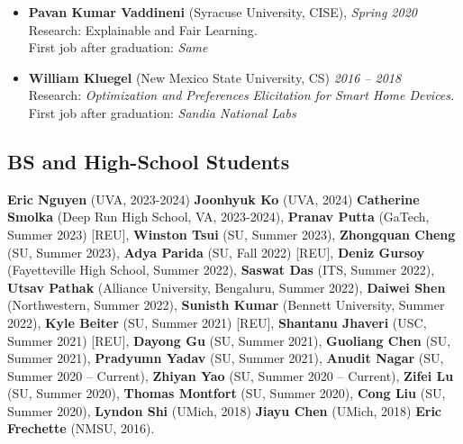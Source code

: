 \begin{itemize}
  \item \textbf{Pavan Kumar Vaddineni}  ({\sc Syracuse University}, CISE), \hfill{\em Spring 2020}\\
  {\sc Research}: Explainable and Fair Learning.\\
  First job after graduation: \textit{Same}

  \item \textbf{William Kluegel} (New Mexico State University, CS) \hfill{\em 2016 -- 2018} \\
  {\sc Research}: \textit{Optimization and Preferences Elicitation for Smart Home Devices.}\\
  First job after graduation: \textit{Sandia National Labs}
\end{itemize}
\medskip

\subsection*{BS and High-School Students}
  \textbf{Eric Nguyen} (UVA, 2023-2024) %
  \textbf{Joonhyuk Ko} (UVA, 2024) %
  \textbf{Catherine Smolka} (Deep Run High School, VA, 2023-2024), 
  \textbf{Pranav Putta} (GaTech, Summer 2023) [REU],
  \textbf{Winston Tsui} (SU, Summer 2023),
  \textbf{Zhongquan Cheng} (SU, Summer 2023), 
  \textbf{Adya Parida} (SU, Fall 2022) [REU], 
  \textbf{Deniz Gursoy} (Fayetteville High School, Summer 2022), 
  \textbf{Saswat Das} (ITS, Summer 2022), 
  \textbf{Utsav Pathak} (Alliance University, Bengaluru, Summer 2022),
  \textbf{Daiwei Shen} (Northwestern, Summer 2022),
  \textbf{Sunisth Kumar} (Bennett University, Summer 2022),
  \textbf{Kyle Beiter} (SU, Summer 2021) [REU],  %
  \textbf{Shantanu Jhaveri} (USC, Summer 2021) [REU], %
  \textbf{Dayong Gu} (SU, Summer 2021),
  \textbf{Guoliang Chen} (SU, Summer 2021),
  \textbf{Pradyumn Yadav} (SU, Summer 2021),
  \textbf{Anudit Nagar} (SU, Summer 2020 -- Current), 
  \textbf{Zhiyan Yao} (SU, Summer 2020 -- Current),
  \textbf{Zifei Lu} (SU, Summer 2020),
  \textbf{Thomas Montfort} (SU, Summer 2020),
  \textbf{Cong Liu} (SU, Summer 2020),
  \textbf{Lyndon Shi} (UMich, 2018)
  \textbf{Jiayu Chen} (UMich, 2018)
  \textbf{Eric Frechette} (NMSU, 2016).

\medskip

